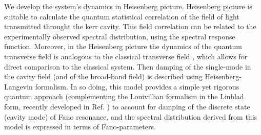 \documentclass[12pt]{article}
\begin{document}
We develop the system's dynamics in Heisenberg picture. Heisenberg picture is 
suitable to calculate the quantum statistical correlation of the field of light 
transmitted throught the kerr cavity. This field correlation can be related to 
the experimentally observed spectral distribution, using the spectral response 
function. \cite{scully1999quantum} Moreover, in the Heisenberg picture the 
dynamics of the quantum transverse field is analogous to the classical 
transverse field \cite{tannoudji1992atom}, which allows for direct comparison 
to the classical system. \cite{pan2019elucidating} Then damping of the 
single-mode in the cavity field (and of the broad-band field) is described 
using Heisenberg-Langevin formalism. In so doing, this model provides a simple 
yet rigorous quantum approach (complementing the Louivillian formalism in the
Linblad form, recently developed in Ref. \cite{finkelstein2015fano, 
finkelstein2016nonlinear}) to account for damping of the discrete state 
(cavity mode) of Fano resonance, and the spectral distribution derived from 
this model is expressed in terms of Fano-parameters. \cite{fano1961effects}
\end{document}
